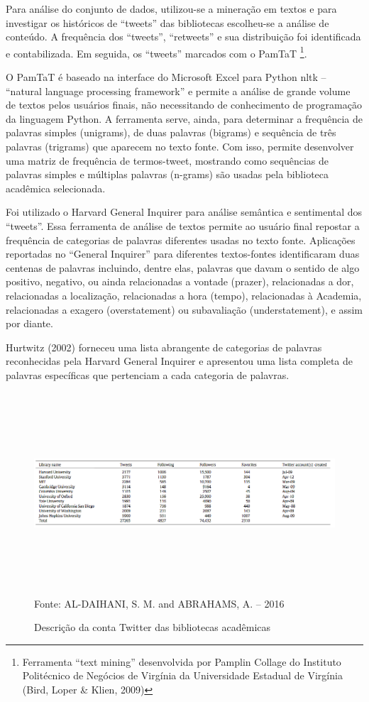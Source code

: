 Para análise do conjunto de dados, utilizou-se a mineração em textos e para investigar os históricos de ``tweets'' das bibliotecas escolheu-se a análise de conteúdo. A frequência dos ``tweets'', ``retweets'' e sua distribuição foi identificada e contabilizada. Em seguida, os ``tweets'' marcados com o PamTaT \footnote{ Ferramenta ``text mining'' desenvolvida por Pamplin Collage do Instituto Politécnico de Negócios de Virgínia da Universidade Estadual de Virgínia (Bird, Loper \& Klien, 2009)}. 

O PamTaT é baseado na interface do Microsoft Excel para Python nltk -- ``natural language processing framework'' e permite a análise de grande volume de textos pelos usuários finais, não necessitando de conhecimento de programação da linguagem Python. A ferramenta serve, ainda, para determinar a frequência de palavras simples (unigrams), de duas palavras (bigrams) e sequência de três palavras (trigrams) que aparecem no texto fonte. Com isso, permite desenvolver uma matriz de frequência de termos-tweet, mostrando como sequências de palavras simples e múltiplas palavras (n-grams) são usadas pela biblioteca acadêmica selecionada. 

Foi utilizado o Harvard General Inquirer \cite{stone1968general} para análise semântica e sentimental dos ``tweets''. Essa ferramenta de análise de textos permite ao usuário final repostar a frequência de categorias de palavras diferentes usadas no texto fonte. Aplicações reportadas no ``General Inquirer'' para diferentes textos-fontes identificaram duas centenas de palavras incluindo, dentre elas, palavras que davam o sentido de algo positivo, negativo, ou ainda relacionadas a vontade (prazer), relacionadas a dor, relacionadas a localização, relacionadas a hora (tempo), relacionadas à Academia, relacionadas a exagero (overstatement) ou subavaliação (understatement), e assim por diante. 

Hurtwitz (2002) forneceu uma lista abrangente de categorias de palavras reconhecidas pela Harvard General Inquirer e apresentou uma lista completa de palavras específicas que pertenciam a cada categoria de palavras. 


\begin{figure}[ht]
	\centering
	\caption{Descrição da conta Twitter das bibliotecas acadêmicas}
	\includegraphics[width=175mm, height=75mm]{Figuras/Twitter/contaTwitter.png}\\
	\tiny Fonte: AL-DAIHANI, S. M. and ABRAHAMS, A. -- 2016
\end{figure}

